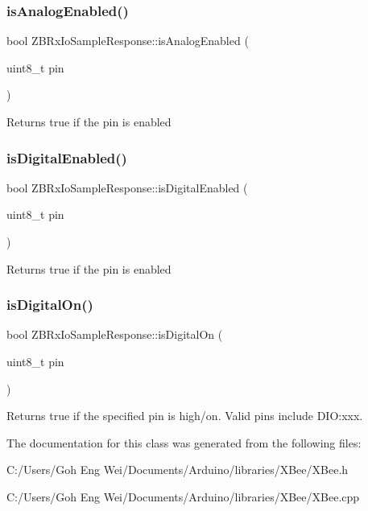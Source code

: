 \subsubsection{\texorpdfstring{is\+Analog\+Enabled()}{isAnalogEnabled()}}
{\footnotesize\ttfamily bool Z\+B\+Rx\+Io\+Sample\+Response\+::is\+Analog\+Enabled (\begin{DoxyParamCaption}\item[{uint8\+\_\+t}]{pin }\end{DoxyParamCaption})}

Returns true if the pin is enabled \hypertarget{class_z_b_rx_io_sample_response_a946c653da11f62b319c3ca6606f8edff}{}\label{class_z_b_rx_io_sample_response_a946c653da11f62b319c3ca6606f8edff} 
\subsubsection{\texorpdfstring{is\+Digital\+Enabled()}{isDigitalEnabled()}}
{\footnotesize\ttfamily bool Z\+B\+Rx\+Io\+Sample\+Response\+::is\+Digital\+Enabled (\begin{DoxyParamCaption}\item[{uint8\+\_\+t}]{pin }\end{DoxyParamCaption})}

Returns true if the pin is enabled \hypertarget{class_z_b_rx_io_sample_response_ac94f045360d7dbb009ac16bc437cbbd5}{}\label{class_z_b_rx_io_sample_response_ac94f045360d7dbb009ac16bc437cbbd5} 
\subsubsection{\texorpdfstring{is\+Digital\+On()}{isDigitalOn()}}
{\footnotesize\ttfamily bool Z\+B\+Rx\+Io\+Sample\+Response\+::is\+Digital\+On (\begin{DoxyParamCaption}\item[{uint8\+\_\+t}]{pin }\end{DoxyParamCaption})}

Returns true if the specified pin is high/on. Valid pins include D\+IO\+:xxx. 

The documentation for this class was generated from the following files\+:\begin{DoxyCompactItemize}
\item 
C\+:/\+Users/\+Goh Eng Wei/\+Documents/\+Arduino/libraries/\+X\+Bee/X\+Bee.\+h\item 
C\+:/\+Users/\+Goh Eng Wei/\+Documents/\+Arduino/libraries/\+X\+Bee/X\+Bee.\+cpp\end{DoxyCompactItemize}

